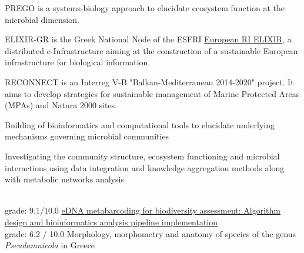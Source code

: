 \documentclass[
	a4paper,
]{fortysecondscv}
\begin{document}
\makefrontsidebar

\begin{cvtable}[3]


	{PREGO is a systems-biology approach to elucidate ecosystem function at the microbial dimension.}
	
	{ELIXIR-GR is the Greek National Node of the ESFRI \href{https://elixir-europe.org/}{European RI ELIXIR}, a distributed e-Infrastructure aiming at the construction of a sustainable European infrastructure for biological information.}
	
	{RECONNECT is an Interreg V-B "Balkan-Mediterranean 2014-2020" project. It aims to develop strategies for sustainable management of Marine Protected Areas (MPAs) and Natura 2000 sites.}

\end{cvtable}






\begin{cvtable}[1.5]
	    {Building of bioinformatics and computational tools to elucidate underlying mechanisms governing microbial communities}
	
	    {Investigating the community structure, ecosystem functioning and microbial interactions using data integration and knowledge aggregation methods along with metabolic networks analysis}

    \\
		{grade: 9.1/10.0}
	    {\href{https://www.openarchives.gr/aggregator-openarchives/edm/elocus/000018-dlib_5_2_f_metadata-dlib-1545038085-364284-26948.tkl}{eDNA metabarcoding for biodiversity assessment: Algorithm design and bioinformatics analysis pipeline implementation}}
    \\
    
		{grade: 6.2 / 10.0}
		{Morphology, morphometry and anatomy of species of the genus \textit{Pseudamnicola} in Greece}
		
\end{cvtable}
\end{document}
